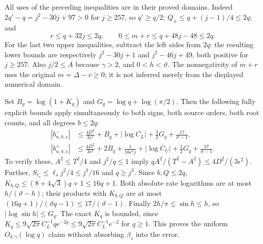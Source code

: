 All uses of the preceding inequalities are in their proved domains.
Indeed
$2q'-q=j^2-30j+97>0$ for $j\ge257$, so $q'\ge q/2$;
$Q_\pm\le q+(j-1)/4\le2q$; and
\[
 r\le q+32j\le2q,\qquad
 0\le m+r\le q+48j-48\le2q.
\tag{ATG24}
\]
For the last two upper inequalities, subtract the left sides from
$2q$: the resulting lower bounds are respectively
$j^2-30j+1$ and $j^2-46j+49$, both positive for $j\ge257$.
Also $j/2\le A$ because $\gamma>2$, and $0<h<\vartheta$.
The nonnegativity of $m+r$ uses the original $m=\Delta-v\ge0$;
it is not inferred merely from the displayed numerical domain.

Set $B_q=\log(1+K_q)$ and
$G_q=\log q+\log(\pi/2)$. Then the following fully explicit
bounds apply simultaneously to both signs, both source orders,
both root counts, and all degrees $b\le2q$:
\[
\begin{split}
 |b^-_{n,b,s}|&\le
 \frac{4D^2}{3\epsilon^2}+B_q+|\log C_L|
       +\tfrac32G_q+\frac{17}{\vartheta-1},\\
 |b^+_{n,b,s}|&\le
 \frac{4D^2}{3\epsilon^2}+2B_q+
       \frac1{16\epsilon^2j}+|\log C_U|
       +\tfrac12G_q+\frac{17}{\vartheta-1}.
\end{split}\tag{ATG25}
\]
To verify these, $A^2\le T^2/4$ and $j^2/q\le1$ imply
$qA^2/(T^2-A^2)\le4D^2/(3\epsilon^2)$.
Further,
$S_{\ell_s}\le\ell_s j^2/4\le j^3/16$ and $q\ge j^2$.
Since $b,Q\le2q$,
$K_{b,Q}\le(8+4\sqrt3)q+1\le16q+1$.
Both absolute rate logarithms are at most
$h/(\vartheta-h)$; their products with $K_{b,Q}$ are at most
$(16q+1)/(\vartheta q-1)\le17/(\vartheta-1)$.
Finally $2h/\pi\le\sin h\le h$, so
$|\log\sin h|\le G_q$.
The exact $K_q$ is bounded, since
$K_q\le9\sqrt{2\pi}C_L^{-1}q e^{-2q}
\le9\sqrt{2\pi}C_L^{-1}e^{-2}$ for $q\ge1$.
This proves the uniform $O_{\delta,\gamma}(\log q)$ claim without
absorbing $\beta_s$ into the error.

